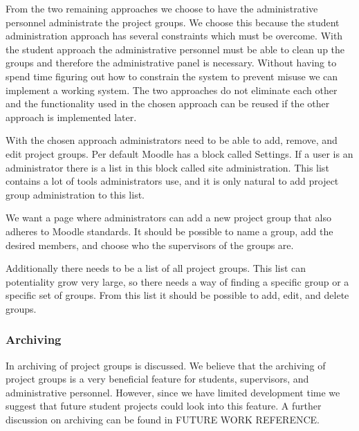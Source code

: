 From the two remaining approaches we choose to have the administrative personnel administrate the project groups. 
We choose this because the student administration approach has several constraints which must be overcome. 
With the student approach the administrative personnel must be able to clean up the groups and therefore the administrative panel is necessary. 
Without having to spend time figuring out how to constrain the system to prevent misuse we can implement a working system.
The two approaches do not eliminate each other and the functionality used in the chosen approach can be reused if the other approach is implemented later.

With the chosen approach administrators need to be able to add, remove, and edit project groups.
Per default Moodle has a block called Settings. 
If a user is an administrator there is a list in this block called site administration. 
This list contains a lot of tools administrators use, and it is only natural to add project group administration to this list. 

We want a page where administrators can add a new project group that also adheres to Moodle standards.
It should be possible to name a group, add the desired members, and choose who the supervisors of the groups are.

Additionally there needs to be a list of all project groups.
This list can potentiality grow very large, so there needs a way of finding a specific group or a specific set of groups. 
From this list it should be possible to add, edit, and delete groups. 

\subsubsection{Archiving}
In  archiving of project groups is discussed.
We believe that the archiving of project groups is a very beneficial feature for students, supervisors, and administrative personnel.
However, since we have limited development time we suggest that future student projects could look into this feature.
A further discussion on archiving can be found in FUTURE WORK REFERENCE. 
